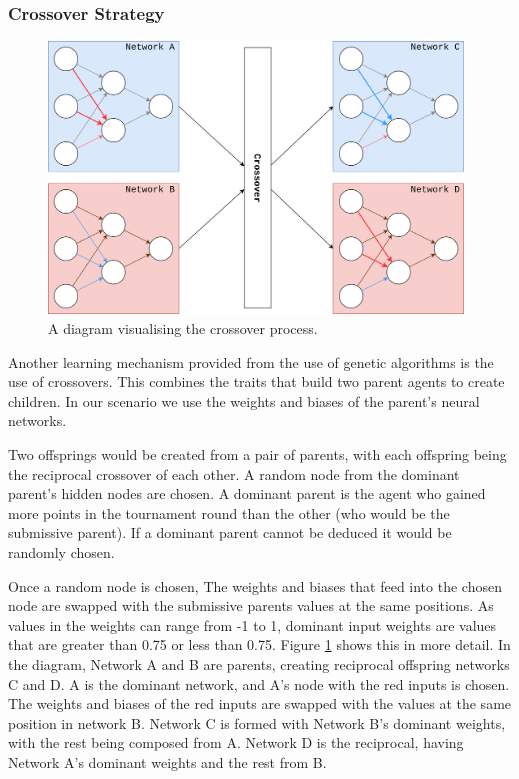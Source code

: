 \documentclass[12pt,a4paper]{article}
\begin{document}
\subsubsection{Crossover Strategy} \label{crossover_strategy}

        
    \begin{figure}[!ht]
        \centering
        \includegraphics[width=110mm]{crossover.png}
        \caption{A diagram visualising the crossover process.\label{crossoverpic}}
    \end{figure}

    Another learning mechanism provided from the use of genetic algorithms is the use of crossovers. This combines the traits that build two parent agents to create children. In our scenario we use the weights and biases of the parent's neural networks.

    Two offsprings would be created from a pair of parents, with each offspring being the reciprocal crossover of each other. 
    A random node from the dominant parent's hidden nodes are chosen. A dominant parent is the agent who gained more points in the tournament round than the other (who would be the submissive parent). If a dominant parent cannot be deduced it would be randomly chosen. 
    
    Once a random node is chosen, The weights and biases that feed into the chosen node are swapped with the submissive parents values at the same positions. As values in the weights can range from -1 to 1, dominant input weights are values that are greater than 0.75 or less than 0.75. 
    Figure \ref{crossoverpic} shows this in more detail. In the diagram, Network A and B are parents, creating reciprocal offspring networks C and D. A is the dominant network, and A's node with the red inputs is chosen. The weights and biases of the red inputs are swapped with the values at the same position in network B. Network C is formed with Network B's dominant weights, with the rest being composed from A. Network D is the reciprocal, having Network A's dominant weights and the rest from B.
\end{document}
